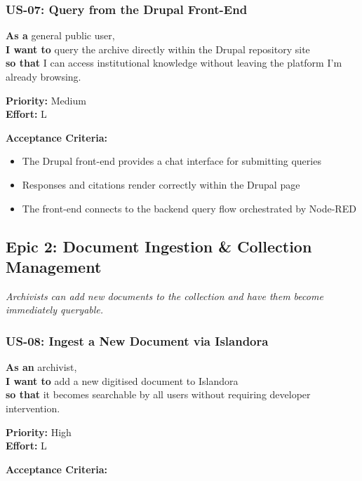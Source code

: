 \documentclass[
  11pt,
]{article}
\providecommand{\tightlist}{%
  \setlength{\itemsep}{0pt}\setlength{\parskip}{0pt}}
\begin{document}
\subsubsection{US-07: Query from the Drupal
Front-End}\label{us-07-query-from-the-drupal-front-end}

\textbf{As a} general public user,\\
\textbf{I want to} query the archive directly within the Drupal
repository site\\
\textbf{so that} I can access institutional knowledge without leaving
the platform I'm already browsing.

\textbf{Priority:} Medium\\
\textbf{Effort:} L

\textbf{Acceptance Criteria:}

\begin{itemize}
\tightlist
\item
  The Drupal front-end provides a chat interface for submitting queries
\item
  Responses and citations render correctly within the Drupal page
\item
  The front-end connects to the backend query flow orchestrated by
  Node-RED
\end{itemize}

\subsection{Epic 2: Document Ingestion \& Collection
Management}\label{epic-2-document-ingestion-collection-management}

\emph{Archivists can add new documents to the collection and have them
become immediately queryable.}

\subsubsection{US-08: Ingest a New Document via
Islandora}\label{us-08-ingest-a-new-document-via-islandora}

\textbf{As an} archivist,\\
\textbf{I want to} add a new digitised document to Islandora\\
\textbf{so that} it becomes searchable by all users without requiring
developer intervention.

\textbf{Priority:} High\\
\textbf{Effort:} L

\textbf{Acceptance Criteria:}
\end{document}
